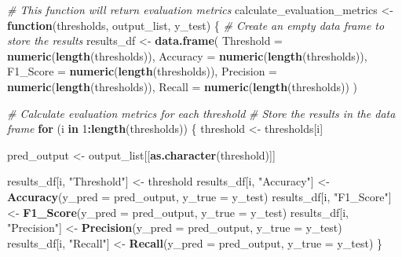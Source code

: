 \documentclass[
]{article}
\newenvironment{Shaded}{\begin{snugshade}}{\end{snugshade}}
\newcommand{\AttributeTok}[1]{\textcolor[rgb]{0.13,0.29,0.53}{#1}}
\newcommand{\CommentTok}[1]{\textcolor[rgb]{0.56,0.35,0.01}{\textit{#1}}}
\newcommand{\ControlFlowTok}[1]{\textcolor[rgb]{0.13,0.29,0.53}{\textbf{#1}}}
\newcommand{\DecValTok}[1]{\textcolor[rgb]{0.00,0.00,0.81}{#1}}
\newcommand{\FunctionTok}[1]{\textcolor[rgb]{0.13,0.29,0.53}{\textbf{#1}}}
\newcommand{\NormalTok}[1]{#1}
\newcommand{\OtherTok}[1]{\textcolor[rgb]{0.56,0.35,0.01}{#1}}
\newcommand{\SpecialCharTok}[1]{\textcolor[rgb]{0.81,0.36,0.00}{\textbf{#1}}}
\newcommand{\StringTok}[1]{\textcolor[rgb]{0.31,0.60,0.02}{#1}}
\begin{document}
\begin{Shaded}
\begin{Highlighting}[]
\CommentTok{\# This function will return evaluation metrics}
\NormalTok{calculate\_evaluation\_metrics }\OtherTok{\textless{}{-}} \ControlFlowTok{function}\NormalTok{(thresholds, output\_list, y\_test) \{}
  \CommentTok{\# Create an empty data frame to store the results}
\NormalTok{  results\_df }\OtherTok{\textless{}{-}} \FunctionTok{data.frame}\NormalTok{(}
    \AttributeTok{Threshold =} \FunctionTok{numeric}\NormalTok{(}\FunctionTok{length}\NormalTok{(thresholds)),}
    \AttributeTok{Accuracy =} \FunctionTok{numeric}\NormalTok{(}\FunctionTok{length}\NormalTok{(thresholds)),}
    \AttributeTok{F1\_Score =} \FunctionTok{numeric}\NormalTok{(}\FunctionTok{length}\NormalTok{(thresholds)),}
    \AttributeTok{Precision =} \FunctionTok{numeric}\NormalTok{(}\FunctionTok{length}\NormalTok{(thresholds)),}
    \AttributeTok{Recall =} \FunctionTok{numeric}\NormalTok{(}\FunctionTok{length}\NormalTok{(thresholds))}
\NormalTok{  )}
  
  \CommentTok{\# Calculate evaluation metrics for each threshold }
  \CommentTok{\# Store the results in the data frame}
  \ControlFlowTok{for}\NormalTok{ (i }\ControlFlowTok{in} \DecValTok{1}\SpecialCharTok{:}\FunctionTok{length}\NormalTok{(thresholds)) \{}
\NormalTok{    threshold }\OtherTok{\textless{}{-}}\NormalTok{ thresholds[i]}
    
\NormalTok{    pred\_output }\OtherTok{\textless{}{-}}\NormalTok{ output\_list[[}\FunctionTok{as.character}\NormalTok{(threshold)]]}
    
\NormalTok{    results\_df[i, }\StringTok{"Threshold"}\NormalTok{] }\OtherTok{\textless{}{-}}\NormalTok{ threshold}
\NormalTok{    results\_df[i, }\StringTok{"Accuracy"}\NormalTok{] }\OtherTok{\textless{}{-}} \FunctionTok{Accuracy}\NormalTok{(}\AttributeTok{y\_pred =}\NormalTok{ pred\_output, }\AttributeTok{y\_true =}\NormalTok{ y\_test)}
\NormalTok{    results\_df[i, }\StringTok{"F1\_Score"}\NormalTok{] }\OtherTok{\textless{}{-}} \FunctionTok{F1\_Score}\NormalTok{(}\AttributeTok{y\_pred =}\NormalTok{ pred\_output, }\AttributeTok{y\_true =}\NormalTok{ y\_test)}
\NormalTok{    results\_df[i, }\StringTok{"Precision"}\NormalTok{] }\OtherTok{\textless{}{-}} \FunctionTok{Precision}\NormalTok{(}\AttributeTok{y\_pred =}\NormalTok{ pred\_output, }\AttributeTok{y\_true =}\NormalTok{ y\_test)}
\NormalTok{    results\_df[i, }\StringTok{"Recall"}\NormalTok{] }\OtherTok{\textless{}{-}} \FunctionTok{Recall}\NormalTok{(}\AttributeTok{y\_pred =}\NormalTok{ pred\_output, }\AttributeTok{y\_true =}\NormalTok{ y\_test)}
\NormalTok{  \}}
  

\end{Highlighting}
\end{Shaded}
\end{document}

